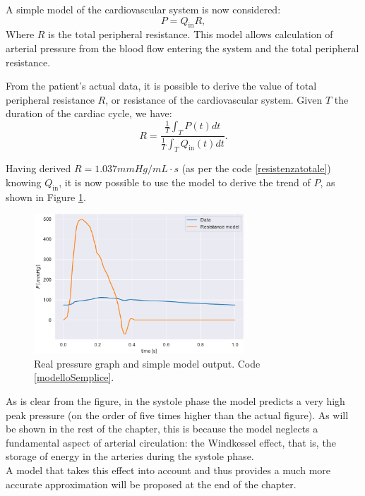 A simple model of the cardiovascular system is now considered:
\[
P=Q_{\text{in}}R,
\]
Where $R$ is the total peripheral resistance. This model allows calculation of arterial pressure from the blood flow entering the system and the total peripheral resistance.



From the patient's actual data, it is possible to derive the value of total peripheral resistance $R$, or resistance of the cardiovascular system. Given $T$ the duration of the cardiac cycle, we have:
\[
R = \frac{\frac{1}{T}\int_TP(t)dt}{\frac{1}{T}\int_TQ_{\text{in}}(t)dt}.
\]

\newpage

Having derived $R=1.037 mmHg/mL\cdot s$ (as per the code \ref{resistenzatotale}) knowing $Q_{\text{in}}$, it is now possible to use the model to derive the trend of $P$, as shown in Figure \ref{figModelloSemplic}.


\begin{figure}[h]
    \centering
    \includegraphics[width=0.7\textwidth]{images/Windkessel/modelloSemplice.pdf}
    \caption{Real pressure graph and simple model output. Code \ref{modelloSemplice}.}
    \label{figModelloSemplic}
\end{figure}

As is clear from the figure, in the systole phase the model predicts a very high peak pressure (on the order of five times higher than the actual figure). As will be shown in the rest of the chapter, this is because the model neglects a fundamental aspect of arterial circulation: the Windkessel effect, that is, the storage of energy in the arteries during the systole phase.\\
A model that takes this effect into account and thus provides a much more accurate approximation will be proposed at the end of the chapter.


\newpage




